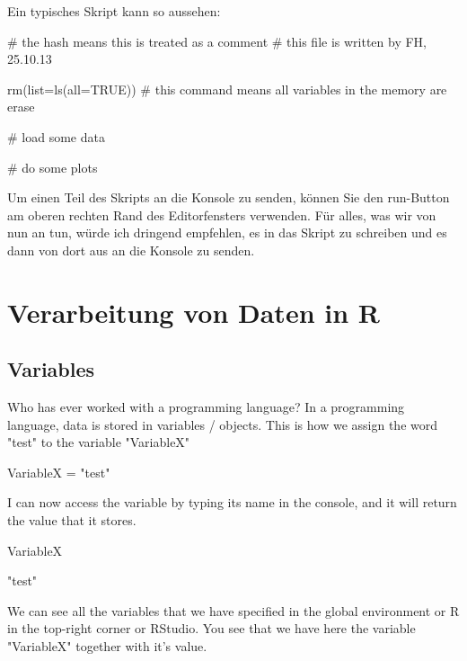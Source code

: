 \documentclass[a4paper,twoside]{tufte-book}\usepackage[]{graphicx}\usepackage[]{color}
\begin{document}
\begin{Anhang}
Ein typisches Skript kann so aussehen:

\begin{Schunk}
\begin{Sinput}
# the hash means this is treated as a comment
# this file is written by FH, 25.10.13

rm(list=ls(all=TRUE))  # this command means all variables in the memory are erase

# load some data

# do some plots
\end{Sinput}
\end{Schunk}

Um einen Teil des Skripts an die Konsole zu senden, können Sie den run-Button am oberen rechten Rand des Editorfensters verwenden. Für alles, was wir von nun an tun, würde ich dringend empfehlen, es in das Skript zu schreiben und es dann von dort aus an die Konsole zu senden.

\chapter{Verarbeitung von Daten in R}
\label{HandlingDataInR}

\section{Variables}

Who has ever worked with a programming language? In a programming language, data is stored in variables / objects. This is how we assign the word "test" to the variable "VariableX"

\begin{Schunk}
\begin{Sinput}
VariableX = "test"
\end{Sinput}
\end{Schunk}

I can now access the variable by typing its name in the console, and it will return the value that it stores.
\begin{Schunk}
\begin{Sinput}
VariableX
\end{Sinput}
\begin{Soutput}
[1] "test"
\end{Soutput}
\end{Schunk}

We can see all the variables that we have specified in the global environment or R in the top-right corner or RStudio. You see that we have here the variable "VariableX" together with it's value. 



\end{Anhang}
\end{document}
